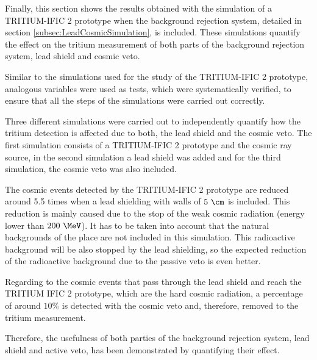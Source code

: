 Finally, this section shows the results obtained with the simulation of a TRITIUM-IFIC 2 prototype when the background rejection system, detailed in section \ref{subsec:LeadCosmicSimulation}, is included. These simulations quantify the effect on the tritium measurement of both parts of the background rejection system, lead shield and cosmic veto.

Similar to the simulations used for the study of the TRITIUM-IFIC 2 prototype, analogous variables were used as tests, which were systematically verified, to ensure that all the steps of the simulations were carried out correctly.

Three different simulations were carried out to independently quantify how the tritium detection is affected due to both, the lead shield and the cosmic veto. The first simulation consists of a TRITIUM-IFIC 2 prototype and the cosmic ray source, in the second simulation a lead shield was added and for the third simulation, the cosmic veto was also included.

The cosmic events detected by the TRITIUM-IFIC 2 prototype are reduced around 5.5 times when a lead shielding with walls of $5~\cm$ is included. This reduction is mainly caused due to the stop of the weak cosmic radiation (energy lower than $200~\MeV$). It has to be taken into account that the natural backgrounds of the place are not included in this simulation. This radioactive background will be also stopped by the lead shielding, so the expected reduction of the radioactive background due to the passive veto is even better.

Regarding to the cosmic events that pass through the lead shield and reach the TRITIUM IFIC 2 prototype, which are the hard cosmic radiation, a percentage of around $10\%$ is detected with the cosmic veto and, therefore, removed to the tritium measurement.

Therefore, the usefulness of both parties of the background rejection system, lead shield and active veto, has been demonstrated by quantifying their effect.